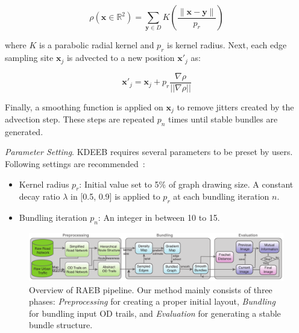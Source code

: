 \vspace{-7mm}
\begin{equation}\label{eq:kernel_density_estimation}
\rho(\textbf{x} \in \mathbb{R}^2) = \sum_{\textbf{y} \in D} K (\frac{\|\textbf{x}-\textbf{y}\|}{p_r})
\end{equation}

where $K$ is a parabolic radial kernel and $p_r$ is kernel radius.
Next, each edge sampling site $\textbf{x}_j$ is advected to a new position $\textbf{x}'_j$ as:

\vspace{-5mm}
\begin{equation}\label{eq:advecting_points}
\textbf{x}'_j = \textbf{x}_j + p_r \frac{\nabla \rho}{||\nabla \rho||}
\end{equation}

Finally, a smoothing function is applied on $\textbf{x}_j$ to remove jitters created by the advection step.
These steps are repeated $p_n$ times until stable bundles are generated.

\vspace{2mm}
\noindent
\textit{Parameter Setting}.
KDEEB requires several parameters to be preset by users.
Following settings are recommended~\cite{van2016cubu}:
\begin{itemize}

\item 
Kernel radius $p_r$: Initial value set to 5\% of graph drawing size.
A constant decay ratio $\lambda$ in [0.5, 0.9] is applied to $p_r$ at each bundling iteration $n$.

\item
Bundling iteration $p_n$: An integer in between 10 to 15.

\end{itemize}

\begin{figure}[t]
	\centering
	\includegraphics[width=0.995\textwidth]{figure/edgebundling/fig3_framework/framework2.pdf}
	\vspace{-9mm}
	\caption{Overview of RAEB pipeline.
	Our method mainly consists of three phases: \textit{Preprocessing} for creating a proper initial layout, \textit{Bundling} for bundling input OD trails, and \textit{Evaluation} for generating a stable bundle structure.}
	\label{fig:framework}
	\vspace{-1mm}
\end{figure}

